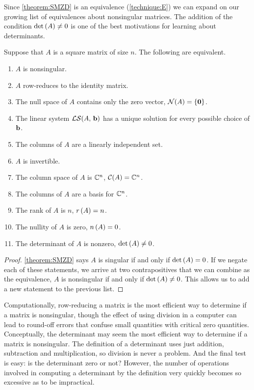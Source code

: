 \documentclass{ximera}
\begin{document}
Since \ref{theorem:SMZD} is an equivalence (\ref{technique:E}) we can
expand on our growing list of equivalences about nonsingular matrices.
The addition of the condition $\det\left(A\right)\neq 0$ is one of the best
motivations for learning about determinants.

\begin{theorem}

Suppose that $A$ is a square matrix of size $n$.  The following are equivalent.
\begin{enumerate}
\item $A$ is nonsingular.
\item $A$ row-reduces to the identity matrix.
\item The null space of $A$ contains only the zero vector, $\mathcal{N}\!\left(A\right)=\left\{\mathbf{0}\right\}$.
\item The linear system $\mathcal{LS}\!\left(A,\,\mathbf{b}\right)$ has a unique solution for every possible choice of $\mathbf{b}$.
\item The columns of $A$ are a linearly independent set.
\item $A$ is invertible.
\item The column space of $A$ is $\mathbb{C}^{n}$, $\mathcal{C}\!\left(A\right)=\mathbb{C}^{n}$.
\item The columns of $A$ are a basis for $\mathbb{C}^{n}$.
\item The rank of $A$ is $n$, $r\left(A\right)=n$.
\item The nullity of $A$ is zero, $n\left(A\right)=0$.
\item The determinant of $A$ is nonzero, $\det\left(A\right)\neq 0$.
\end{enumerate}

\begin{proof}
  \ref{theorem:SMZD} says $A$ is singular if and only if
  $\det\left(A\right)=0$.  If we negate each of these statements, we arrive
  at two contrapositives that we can combine as the equivalence, $A$
  is nonsingular if and only if $\det\left(A\right)\neq 0$.  This allows us
  to add a new statement to the previous list.
\end{proof}
\end{theorem}

Computationally, row-reducing a matrix is the most efficient way to
determine if a matrix is nonsingular, though the effect of using
division in a computer can lead to round-off errors that confuse small
quantities with critical zero quantities.  Conceptually, the
determinant may seem the most efficient way to determine if a matrix
is nonsingular.  The definition of a determinant uses just addition,
subtraction and multiplication, so division is never a problem.  And
the final test is easy: is the determinant zero or not?  However, the
number of operations involved in computing a determinant by the
definition very quickly becomes so excessive as to be impractical.
\end{document}
